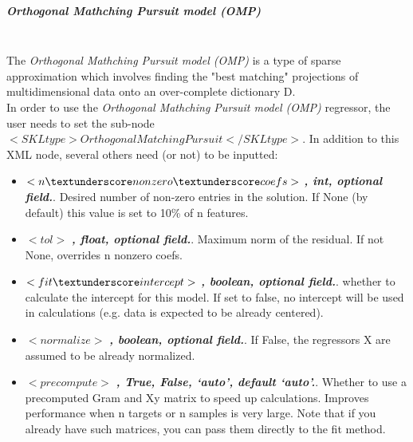 \subparagraph{Orthogonal Mathching Pursuit model (OMP)}
\mbox{}
\\The \textit{Orthogonal Mathching Pursuit model (OMP)} is a type of sparse approximation which involves finding the "best matching" projections of multidimensional data onto an over-complete dictionary D. 
\\In order to use the \textit{Orthogonal Mathching Pursuit model (OMP)} regressor, the user needs to set the sub-node $<SKLtype>OrthogonalMatchingPursuit</SKLtype>$.
In addition to this XML node, several others need (or not) to be inputted:
\begin{itemize}
  \item $<n \textunderscore nonzero \textunderscore coefs>$ \textbf{\textit{, int, optional field.}}. Desired number of non-zero entries in the solution. If None (by default) this value is set to 10\% of n \textunderscore features.
  \item $<tol>$ \textbf{\textit{, float, optional field.}}. Maximum norm of the residual. If not None, overrides n \textunderscore nonzero \textunderscore coefs.
  \item $<fit \textunderscore intercept>$ \textbf{\textit{, boolean, optional field.}}. whether to calculate the intercept for this model. If set to false, no intercept will be used in calculations (e.g. data is expected to be already centered).
  \item $<normalize>$ \textbf{\textit{, boolean, optional field.}}. If False, the regressors X are assumed to be already normalized.
  \item $<precompute>$ \textbf{\textit{, {True, False, ‘auto’}, default ‘auto’.}}. Whether to use a precomputed Gram and Xy matrix to speed up calculations. Improves performance when n \textunderscore targets or n \textunderscore samples is very large. Note that if you already have such matrices, you can pass them directly to the fit method.
\end{itemize}


